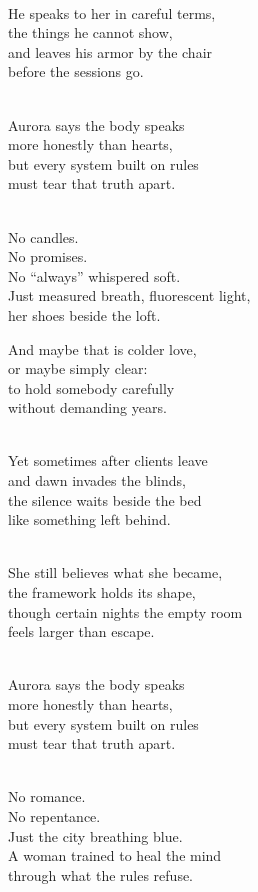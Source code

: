 \begin{lyrics}
\\
He speaks to her in careful terms,\\
the things he cannot show,\\
and leaves his armor by the chair\\
before the sessions go.

\\
Aurora says the body speaks\\
more honestly than hearts,\\
but every system built on rules\\
must tear that truth apart.

\\
No candles.\\
No promises.\\
No “always” whispered soft.\\
Just measured breath, fluorescent light,\\
her shoes beside the loft.

And maybe that is colder love,\\
or maybe simply clear:\\
to hold somebody carefully\\
without demanding years.

\\
Yet sometimes after clients leave\\
and dawn invades the blinds,\\
the silence waits beside the bed\\
like something left behind.

\\
She still believes what she became,\\
the framework holds its shape,\\
though certain nights the empty room\\
feels larger than escape.

\\
Aurora says the body speaks\\
more honestly than hearts,\\
but every system built on rules\\
must tear that truth apart.

\\
No romance.\\
No repentance.\\
Just the city breathing blue.\\
A woman trained to heal the mind\\
through what the rules refuse.

\end{lyrics}

